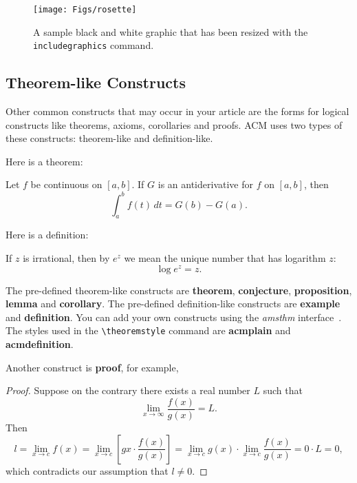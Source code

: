 \begin{figure}
\texttt{[image: Figs/rosette]}
\caption{A sample black and white graphic that has
been resized with the \texttt{includegraphics} command.}
\end{figure}

\subsection{Theorem-like Constructs}

Other common constructs that may occur in your article are the forms
for logical constructs like theorems, axioms, corollaries and proofs.
ACM uses two types of these constructs:  theorem-like and
definition-like.

Here is a theorem:
\begin{theorem}
  Let $f$ be continuous on $[a,b]$.  If $G$ is
  an antiderivative for $f$ on $[a,b]$, then
  \begin{displaymath}
    \int^b_af(t)\,dt = G(b) - G(a).
  \end{displaymath}
\end{theorem}

Here is a definition:
\begin{definition}
  If $z$ is irrational, then by $e^z$ we mean the
  unique number that has
  logarithm $z$:
  \begin{displaymath}
    \log e^z = z.
  \end{displaymath}
\end{definition}

The pre-defined theorem-like constructs are \textbf{theorem},
\textbf{conjecture}, \textbf{proposition}, \textbf{lemma} and
\textbf{corollary}.  The pre-defined de\-fi\-ni\-ti\-on-like constructs are
\textbf{example} and \textbf{definition}.  You can add your own
constructs using the \textsl{amsthm} interface~\cite{Amsthm15}.  The
styles used in the \verb|\theoremstyle| command are \textbf{acmplain}
and \textbf{acmdefinition}.

Another construct is \textbf{proof}, for example,

\begin{proof}
  Suppose on the contrary there exists a real number $L$ such that
  \begin{displaymath}
    \lim_{x\rightarrow\infty} \frac{f(x)}{g(x)} = L.
  \end{displaymath}
  Then
  \begin{displaymath}
    l=\lim_{x\rightarrow c} f(x)
    = \lim_{x\rightarrow c}
    \left[ g{x} \cdot \frac{f(x)}{g(x)} \right ]
    = \lim_{x\rightarrow c} g(x) \cdot \lim_{x\rightarrow c}
    \frac{f(x)}{g(x)} = 0\cdot L = 0,
  \end{displaymath}
  which contradicts our assumption that $l\neq 0$.
\end{proof}

